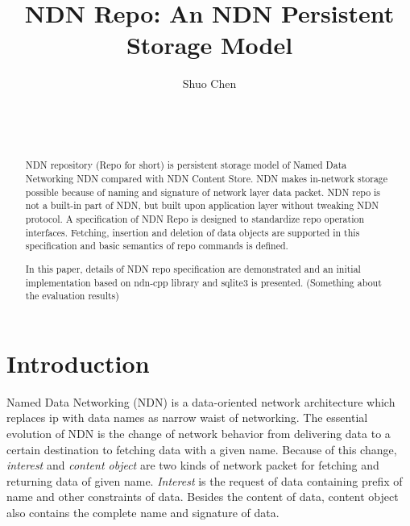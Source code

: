 \documentclass{acm_proc_article-sp}
\begin{document}
\title{NDN Repo: An NDN Persistent Storage Model}


\author{
\alignauthor
Shuo Chen\\
	\\
	\\
	\\
}
\maketitle

\begin{abstract}
NDN repository (Repo for short) is persistent storage model of Named Data Networking NDN compared with NDN Content Store. NDN makes in-network storage possible because of naming and signature of network layer data packet. NDN repo is not a built-in part of NDN, but built upon application layer without tweaking NDN protocol. A specification of NDN Repo is designed to standardize repo operation interfaces. Fetching, insertion and deletion of data objects are supported in this specification and basic semantics of repo commands is defined.

In this paper, details of NDN repo specification are demonstrated and an initial implementation based on ndn-cpp library and sqlite3 is presented. (Something about the evaluation results)
\end{abstract}

\section{Introduction}
Named Data Networking (NDN) \cite{zhang2010named} is a data-oriented network architecture which replaces ip with data names as narrow waist of networking. The essential evolution of NDN is the change of network behavior from delivering data to a certain destination to fetching data with a given name. \cite{zhang2010named} Because of this change, \emph{interest} and \emph{content object} are two kinds of network packet for fetching and returning data of given name. \emph{Interest} is the request of data containing prefix of name and other constraints of data. Besides the content of data, content object also contains the complete name and signature of data.
\end{document}
